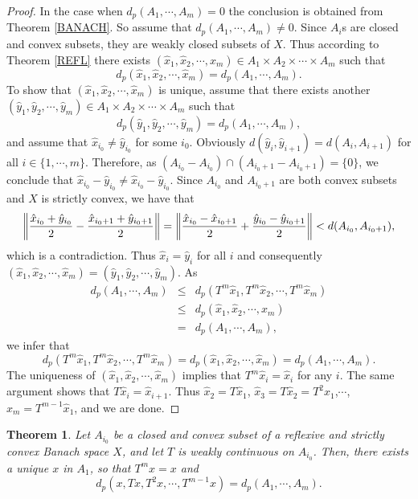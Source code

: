 \documentclass{amsart}
\newtheorem{theorem}{Theorem}[section]
\theoremstyle{definition}
\theoremstyle{remark}
\begin{document}
\begin{proof}In the case when $d_p(A_1,\cdots,A_m)=0$ the conclusion is obtained from Theorem \ref{BANACH}. So assume that $d_p(A_1,\cdots,A_m)\neq0$. Since $A_i$s are closed and convex subsets, they are weakly closed subsets of $X$. Thus according to Theorem \ref{REFL} there exists $(\hat{x}_1,\hat{x}_2,\cdots,\hat{x}_m)\in A_1\times A_2\times\cdots\times A_m$ such that
$$d_p(\hat{x}_1,\hat{x}_2,\cdots,\hat{x}_m)=d_p(A_1,\cdots,A_m).$$ To show that $(\hat{x}_1,\hat{x}_2,\cdots,\hat{x}_m)$ is unique, assume that there exists another $(\hat{y}_1,\hat{y}_2,\cdots,\hat{y}_m)\in A_1\times A_2\times\cdots\times A_m$ such that
$$d_p(\hat{y}_1,\hat{y}_2,\cdots,\hat{y}_m)=d_p(A_1,\cdots,A_m),$$ and assume that  $\hat{x}_{i_0}\neq\hat{y}_{i_0}$ for some $i_0$. Obviously $d(\hat{y}_{i},\hat{y}_{i+1})=d(A_{i},A_{i+1})$ for all $i\in\{1,\cdots,m\}$. Therefore, as $(A_{i_0}-A_{i_0})\cap(A_{i_0+1}-A_{i_0+1})=\{0\}$, we conclude that $\hat{x}_{i_0}-\hat{y}_{i_0}\neq\hat{x}_{i_0}-\hat{y}_{i_0}$. Since $A_{i_0}$ and $A_{i_0+1}$ are both convex subsets and $X$ is strictly convex, we have that
$$\left\|{{\hat{x}_{i_0}+\hat{y}_{i_0}}\over{2}}-{{\hat{x}_{i_0+1}+\hat{y}_{i_0+1}}\over{2}}\right\|=\left\|{{\hat{x}_{i_0}-\hat{x}_{i_0+1}}\over{2}}+{{\hat{y}_{i_0}-\hat{y}_{i_0+1}}\over{2}}\right\|<d(A_{i_0},A_{i_0+1}),$$ which is a  contradiction. Thus $\hat{x}_{i}=\hat{y}_{i}$ for all $i$ and consequently $(\hat{x}_1,\hat{x}_2,\cdots,\hat{x}_m)=(\hat{y}_1,\hat{y}_2,\cdots,\hat{y}_m)$. As
\begin{eqnarray*}
d_p(A_1,\cdots,A_m)&\leq& d_p(T^m\hat{x}_1,T^m\hat{x}_2,\cdots,T^m\hat{x}_m)\\&\leq& d_p(\hat{x}_1,\hat{x}_2,\cdots,\hat{x}_m)\\&=&d_p(A_1,\cdots,A_m),
\end{eqnarray*}
 we infer that $$d_p(T^m\hat{x}_1,T^m\hat{x}_2,\cdots,T^m\hat{x}_m)=d_p(\hat{x}_1,\hat{x}_2,\cdots,\hat{x}_m)=d_p(A_1,\cdots,A_m).$$ The uniqueness of $(\hat{x}_1,\hat{x}_2,\cdots,\hat{x}_m)$ implies that $T^m\hat{x}_i=\hat{x}_i$ for any $i$. The same argument shows that $T\hat{x}_{i}=\hat{x}_{i+1}$. Thus $\hat{x}_2=T\hat{x}_1$, $\hat{x}_3=T\hat{x}_2=T^2\hat{x}_1$,$\cdots$, $\hat{x}_m=T^{m-1}\hat{x}_1$, and we are done.
\end{proof}
\begin{theorem}Let $A_{i_0}$ be a closed and convex subset of a reflexive and strictly convex Banach space $X$, and let $T$ is weakly continuous on $A_{i_0}$. Then, there exists a unique $x$ in $A_1$, so that $T^mx=x$ and $$d_p(x,Tx,T^2x,\cdots,T^{m-1}x)=d_p(A_1,\cdots,A_{m}).$$
\end{theorem}
\end{document}
